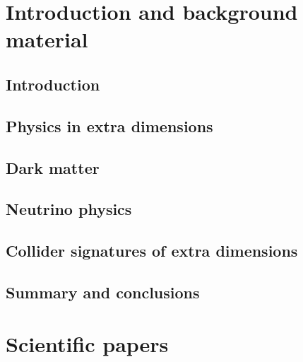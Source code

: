 \documentclass[nocoverpage,swedish,g5paper]{thesis}
\begin{document}
\begin{preface}

\end{preface}

\tableofcontents

\mainmatter

\part{Introduction and background material}

\chapter{Introduction}


\chapter{Physics in extra dimensions}\label{ch:ExtraDimensions}


\chapter{Dark matter}\label{ch:DarkMatter}


\chapter{Neutrino physics}\label{ch:NeutrinoPhysics}


\chapter{Collider signatures of extra dimensions}\label{ch:ColliderPhenomenology}


\chapter{Summary and conclusions}\label{ch:Summary}



%




\part{Scientific papers}


\end{document}
